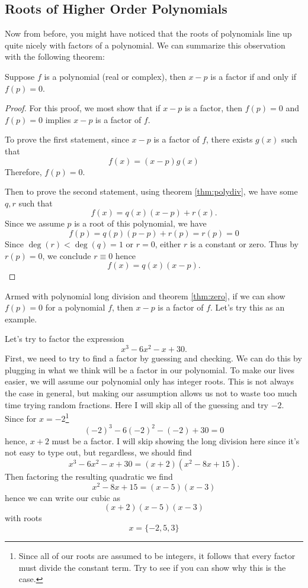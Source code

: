 \subsection{Roots of Higher Order Polynomials}
Now from before, you might have noticed that the roots of polynomials line up quite nicely with factors of a polynomial. We can summarize this observation with the following theorem:
\begin{theorem}
	Suppose $f$ is a polynomial (real or complex), then $x-p$ is a factor if and only if $f(p)=0$.
	\label{thm:zero}
\end{theorem}

\begin{proof}
	For this proof, we most show that if $x-p$ is a factor, then $f(p)=0$ and $f(p)=0$ implies
	$x-p$ is a factor of $f$.
	
	To prove the first statement, since $x-p$ is a factor of $f$, there exists $g(x)$ such that
	$$f(x)=(x-p)g(x)$$
	Therefore, $f(p)=0$.
	
	Then to prove the second statement, using theorem \eqref{thm:polydiv}, we have some $q,r$ such that
	$$f(x)=q(x)(x-p)+r(x).$$
	Since we assume $p$ is a root of this polynomial, we have
	$$f(p)=q(p)(p-p)+r(p)=r(p)=0$$
	Since $\deg(r)<\deg(q)=1$ or $r=0$, either $r$ is a constant or zero. Thus by $r(p)=0$, we conclude $r\equiv 0$ hence
	$$f(x)=q(x)(x-p).$$
\end{proof}

Armed with polynomial long division and theorem \eqref{thm:zero}, if we can show $f(p)=0$ for a polynomial $f$, then $x-p$ is a factor of $f$.
Let's try this as an example.

\begin{ex}
	Let's try to factor the expression 
	$$x^3-6x^2-x+30.$$
	First, we need to try to find a factor by guessing and checking. 
	We can do this by plugging in what we think will be a factor in our polynomial. To make our lives easier, we will assume our polynomial only has integer roots.
	This is not always the case in general, but making our assumption allows us not to waste too much time trying random fractions.
	Here I will skip all of the guessing and try $-2$. Since for $x=-2$\footnote{
	Since all of our roots are assumed to be integers, it follows that every factor must divide the constant term. Try to see if you can show why this is the case.}
	$$(-2)^3-6(-2)^2-(-2)+30=0$$
	hence, $x+2$ must be a factor.
	I will skip showing the long division here since it's not easy to type out, but regardless, we should find
	$$x^3-6x^2-x+30=(x+2)(x^2-8x+15).$$
	Then factoring the resulting quadratic we find
	$$x^2-8x+15=(x-5)(x-3)$$
	hence we can write our cubic as
	$$(x+2)(x-5)(x-3)$$
	with roots
	$$x=\{-2,5,3\}$$
\end{ex}

